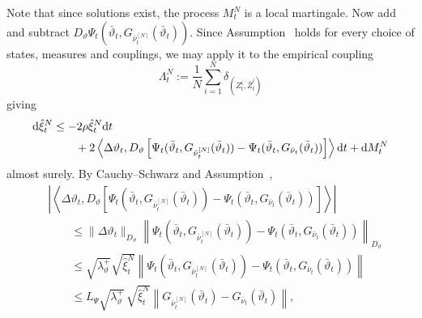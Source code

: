 Note that since solutions exist, the process $M^N_t$ is a local martingale. Now add and subtract
\(D_\vartheta\Psi_t(\bar\vartheta_t,
G_{\bar\nu_t^{[N]}}(\bar\vartheta_t))\). Since
Assumption~ holds for every choice of states, measures and couplings, we may apply it to the empirical
coupling
\[
    \Lambda_t^N
    :=
    \frac1N\sum_{i=1}^N
    \delta_{(Z_t^i,\bar Z_t^i)}
\]
giving
\begin{align*}
    \mathrm{d} \hat\xi_t^N&\le -2\rho\hat\xi_t^N\mathrm{d} t \\
    &\qquad +2\left\langle\Delta\vartheta_t,D_\vartheta
    \left[
    \Psi_t(\bar\vartheta_t,G_{\bar\nu_t^{[N]}}(\bar\vartheta_t))
    -
    \Psi_t(\bar\vartheta_t,G_{\bar\nu_t}(\bar\vartheta_t))\right]\right\rangle \mathrm{d} t + \mathrm{d} M^N_t
\end{align*}
almost surely. By Cauchy--Schwarz and Assumption~,
\begin{align*}
&\left|
\left\langle
    \Delta\vartheta_t,
    D_\vartheta
    \left[
    \Psi_t(\bar\vartheta_t,G_{\bar\nu_t^{[N]}}(\bar\vartheta_t))
    -
    \Psi_t(\bar\vartheta_t,G_{\bar\nu_t}(\bar\vartheta_t))
    \right]
\right\rangle
\right|\\
&\qquad\le
    \|\Delta\vartheta_t\|_{D_{\vartheta}}
    \left\|
    \Psi_t(\bar\vartheta_t,G_{\bar\nu_t^{[N]}}(\bar\vartheta_t))
    -
    \Psi_t(\bar\vartheta_t,G_{\bar\nu_t}(\bar\vartheta_t))
    \right\|_{D_{\vartheta}}
    \\
    &\qquad\le
    \sqrt{\lambda_\vartheta^+}\sqrt{\widehat\xi_t^N}
    \left\|
    \Psi_t(\bar\vartheta_t,G_{\bar\nu_t^{[N]}}(\bar\vartheta_t))
    -
    \Psi_t(\bar\vartheta_t,G_{\bar\nu_t}(\bar\vartheta_t))
    \right\|\\
&\qquad\le
    L_\Psi\sqrt{\lambda_\vartheta^+}\,
    \sqrt{\widehat\xi_t^N}
    \left\|
    G_{\bar\nu_t^{[N]}}(\bar\vartheta_t)
    -
    G_{\bar\nu_t}(\bar\vartheta_t)
    \right\|,
\end{align*}

